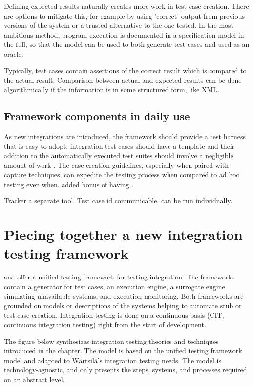 \documentclass[12pt,a4paper,oneside,pdftex]{report}
\begin{document}
{Defining expected results naturally creates more work in test case creation. There are options to mitigate this, for example by using 'correct' output from previous versions of the system or a trusted alternative to the one tested. In the most ambitious method, program execution is documented in a specification model in the full, so that the model can be used to both generate test cases and used as an oracle. \citep{pezze2008software}

Typically, test cases contain assertions of the correct result which is compared to the actual result. Comparison between actual and expected results can be done algorithmically if the information is in some structured form, like XML.

\section{Framework components in daily use}

As new integrations are introduced, the framework should provide a test harness that is easy to adopt: integration test cases should have a template and their addition to the automatically executed test suites should involve a negligible amount of work \citep{fewster1999software}. The case creation guidelines, especially when paired with capture techniques, can expedite the testing process when compared to ad hoc testing even when. added bonus of having . 

Tracker a separate tool. Test case id communicable, can be run individually.
  

\chapter{Piecing together a new integration testing framework}
\label{chapter:frameworkproposal}

\citet{huang2008surrogate} and \citet{liu2009unified} offer a unified testing framework for testing integration. The frameworks contain a generator for test cases, an execution engine, a surrogate engine simulating unavailable systems, and execution monitoring. Both frameworks are grounded on models or descriptions of the systems helping to automate stub or test case creation. Integration testing is done on a continuous basis (CIT, continuous integration testing) right from the start of development.

The figure below synthesizes integration testing theories and techniques introduced in the chapter. The model is based on the \citet{liu2009unified} unified testing framework model and adapted to Wärtsilä's integration testing needs. The model is technology-agnostic, and only presents the steps, systems, and processes required on an abstract level.

}
\end{document}
